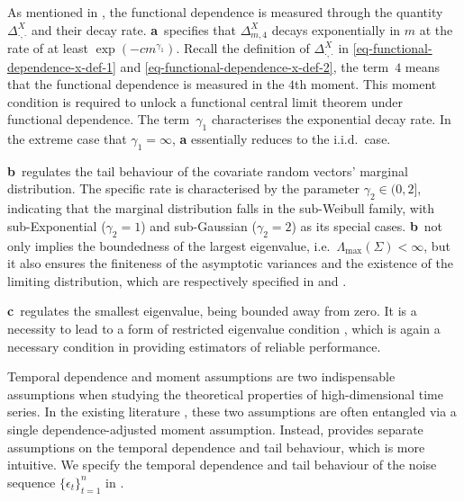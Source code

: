 \documentclass[11pt]{article}
\theoremstyle{plain}
\theoremstyle{definition}
\newcommand{\zifeng}[1]{\textcolor{purple}{(Zifeng: #1)}}
\begin{document}
As mentioned in , the functional dependence is measured through the quantity~$\Delta^X_{\cdot, \cdot}$ and their decay rate.  \textbf{a}~specifies that $\Delta_{m, 4}^X$ decays exponentially in $m$ at the rate of at least $\exp(-cm^{\gamma_1})$.  Recall the definition of $\Delta^X_{\cdot, \cdot}$ in \eqref{eq-functional-dependence-x-def-1} and \eqref{eq-functional-dependence-x-def-2}, the term~$4$ means that the functional dependence is measured in the $4$th moment.  This moment condition is required to unlock a functional central limit theorem under functional dependence.  The term~$\gamma_1$ characterises the exponential decay rate.  In the extreme case that $\gamma_1 = \infty$, \textbf{a} essentially reduces to the i.i.d.~case.

\textbf{b}~regulates the tail behaviour of the covariate random vectors' marginal distribution.  The specific rate is characterised by the parameter $\gamma_2 \in (0, 2]$, indicating that the marginal distribution falls in the sub-Weibull family, with sub-Exponential ($\gamma_2 = 1$) and sub-Gaussian ($\gamma_2 = 2$) as its special cases.  \textbf{b}~not only implies the boundedness of the largest eigenvalue, i.e.~$\Lambda_{\max}(\Sigma) < \infty$, but it also ensures the finiteness of the asymptotic variances and the existence of the limiting distribution, which are respectively specified in  and .

\textbf{c}~regulates the smallest eigenvalue, being bounded away from zero. It is a necessity to lead to a form of restricted eigenvalue condition \citep[e.g.][]{van2018tight}, which is again a necessary condition in providing estimators of reliable performance. %


Temporal dependence and moment assumptions are two indispensable assumptions when studying the theoretical properties of high-dimensional time series.  In the existing literature \citep[e.g.][]{wu2016performance, zhang2017gaussian, kuchibhotla2021uniform}, these two assumptions are often entangled via a single dependence-adjusted moment assumption. Instead,  provides separate assumptions on the temporal dependence and tail behaviour, which is more intuitive. We specify the temporal dependence and tail behaviour of the noise sequence $\{\epsilon_t\}_{t = 1}^n$ in .
\end{document}
